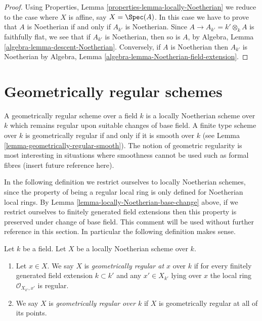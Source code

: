 \begin{proof}
Using Properties, Lemma \ref{properties-lemma-locally-Noetherian}
we reduce to the case where $X$ is
affine, say $X = \Spec(A)$. In this case we have to prove that
$A$ is Noetherian if and only if $A_{k'}$ is Noetherian.
Since $A \to A_{k'} = k' \otimes_k A$ is faithfully flat, we see
that if $A_{k'}$ is Noetherian, then so is $A$, by
Algebra, Lemma \ref{algebra-lemma-descent-Noetherian}.
Conversely, if $A$ is Noetherian then $A_{k'}$ is Noetherian by
Algebra, Lemma \ref{algebra-lemma-Noetherian-field-extension}.
\end{proof}







\section{Geometrically regular schemes}
\label{section-geometrically-regular}

\noindent
A geometrically regular scheme over a field $k$ is a locally Noetherian
scheme over $k$ which remains regular upon suitable changes of base field.
A finite type scheme over $k$ is geometrically regular if and only
if it is smooth over $k$ (see Lemma \ref{lemma-geometrically-regular-smooth}).
The notion of geometric regularity is most interesting in situations
where smoothness cannot be used such as formal fibres (insert future
reference here).

\medskip\noindent
In the following definition we restrict ourselves to locally Noetherian
schemes, since the property of being a regular local ring is only
defined for Noetherian local rings. By
Lemma \ref{lemma-locally-Noetherian-base-change}
above, if we restrict ourselves to finitely generated field extensions then
this property is preserved under change of base field. This comment will be
used without further reference in this section. In particular the following
definition makes sense.

\begin{definition}
\label{definition-geometrically-regular}
Let $k$ be a field. Let $X$ be a locally Noetherian scheme over $k$.
\begin{enumerate}
\item Let $x \in X$. We say $X$ is {\it geometrically regular at $x$}
over $k$ if for every finitely generated field extension $k \subset k'$
and any $x' \in X_{k'}$ lying over $x$ the local ring
$\mathcal{O}_{X_{k'}, x'}$ is regular.
\item We say $X$ is {\it geometrically regular over $k$} if
$X$ is geometrically regular at all of its points.
\end{enumerate}
\end{definition}

